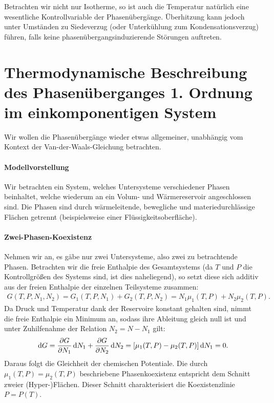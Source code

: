 Betrachten wir nicht nur Isotherme, so ist auch die Temperatur natürlich eine wesentliche Kontrollvariable der Phasenübergänge. Überhitzung kann jedoch unter Umständen zu Siedeverzug (oder Unterkühlung zum Kondensationsverzug) führen, falls keine phasenübergangsinduzierende Störungen auftreten.

\section{Thermodynamische Beschreibung des Phasenüberganges 1. Ordnung im einkomponentigen System}
Wir wollen die Phasenübergänge wieder etwas allgemeiner, unabhängig vom Kontext der Van-der-Waals-Gleichung betrachten.
\paragraph*{Modellvorstellung}
Wir betrachten ein System, welches Untersysteme verschiedener Phasen beinhaltet, welche wiederum an ein Volum- und Wärmereservoir angeschlossen sind. 
Die Phasen sind durch wärmeleitende, bewegliche und materiedurchlässige Flächen getrennt (beispielsweise einer Flüssigkeitsoberfläche).

\paragraph*{Zwei-Phasen-Koexistenz}
Nehmen wir an, es gäbe nur zwei Untersysteme, also zwei zu betrachtende Phasen.
Betrachten wir die freie Enthalpie des Gesamtsystems (da $T$ und $P$ die Kontrollgrößen des Systems sind, ist dies naheliegend), so setzt diese sich additiv aus der freien Enthalpie der einzelnen Teilsysteme zusammen:
\begin{align*}
    G(T,P,N_1,N_2)=G_1(T,P,N_1)+G_2(T,P,N_2)=N_1\mu_1(T,P)+N_2\mu_2(T,P).
\end{align*}
Da Druck und Temperatur dank der Reservoire konstant gehalten sind, nimmt die freie Enthalpie ein Minimum an, sodass ihre Ableitung gleich null ist und unter Zuhilfenahme der Relation $N_2=N-N_1$ gilt:
\begin{align*}
    \mathop{}\!\mathrm{d} G=\frac{\partial G}{\partial N_1}\mathop{}\!\mathrm{d} N_1+\frac{\partial G}{\partial N_2}\mathop{}\!\mathrm{d} N_2=\left[\mu_1(T,P)-\mu_2(T,P)\right]\mathop{}\!\mathrm{d} N_1=0.
\end{align*}
Daraus folgt die Gleichheit der chemischen Potentiale.
Die durch $\mu_1(T,P)=\mu_2(T,P)$ beschriebene Phasenkoexistenz entspricht dem Schnitt zweier (Hyper-)Flächen. Dieser Schnitt charakterisiert die Koexistenzlinie $P=P(T)$.
